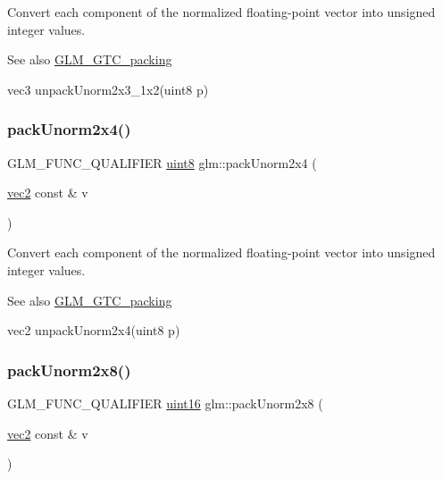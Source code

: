 Convert each component of the normalized floating-\/point vector into unsigned integer values.

\begin{DoxySeeAlso}{See also}
\hyperlink{group__gtc__packing}{G\+L\+M\+\_\+\+G\+T\+C\+\_\+packing} 

vec3 unpack\+Unorm2x3\+\_\+1x2(uint8 p) 
\end{DoxySeeAlso}
\mbox{\label{group__gtc__packing_gad68eb2f848ba867192b8787998c0595a}} 
\subsubsection{\texorpdfstring{pack\+Unorm2x4()}{packUnorm2x4()}}
{\footnotesize\ttfamily G\+L\+M\+\_\+\+F\+U\+N\+C\+\_\+\+Q\+U\+A\+L\+I\+F\+I\+ER \hyperlink{group__gtc__type__precision_ga1a7dcd8aac97cc8020817c94049deff2}{uint8} glm\+::pack\+Unorm2x4 (\begin{DoxyParamCaption}\item[{\hyperlink{group__core__types_gaa1618f51db67eaa145db101d8c8431d8}{vec2} const \&}]{v }\end{DoxyParamCaption})}

Convert each component of the normalized floating-\/point vector into unsigned integer values.

\begin{DoxySeeAlso}{See also}
\hyperlink{group__gtc__packing}{G\+L\+M\+\_\+\+G\+T\+C\+\_\+packing} 

vec2 unpack\+Unorm2x4(uint8 p) 
\end{DoxySeeAlso}
\mbox{\label{group__gtc__packing_ga833288fc0d4a79f19d0db75a6843bfe6}} 
\subsubsection{\texorpdfstring{pack\+Unorm2x8()}{packUnorm2x8()}}
{\footnotesize\ttfamily G\+L\+M\+\_\+\+F\+U\+N\+C\+\_\+\+Q\+U\+A\+L\+I\+F\+I\+ER \hyperlink{group__gtc__type__precision_gad8c2939e1fdd8e5828b31d95c52255d5}{uint16} glm\+::pack\+Unorm2x8 (\begin{DoxyParamCaption}\item[{\hyperlink{group__core__types_gaa1618f51db67eaa145db101d8c8431d8}{vec2} const \&}]{v }\end{DoxyParamCaption})}

